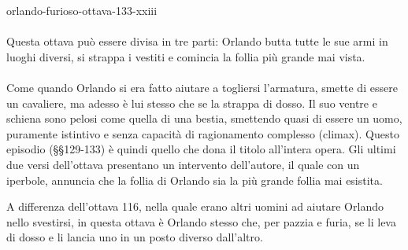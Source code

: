 \documentclass[preview]{standalone}
\begin{document}
\begin{snippet}{orlando-furioso-ottava-133-xxiii}
    \\\\
    Questa ottava può essere divisa in tre parti:
    Orlando butta tutte le sue armi in luoghi diversi, si strappa i vestiti
    e comincia la follia più grande mai vista.
    \\\\
    Come quando Orlando si era fatto aiutare a togliersi l'armatura, smette di essere un cavaliere,
    ma adesso è lui stesso che se la strappa di dosso.
    Il suo ventre e schiena sono pelosi come quella di una bestia,
    smettendo quasi di essere un uomo, puramente istintivo e senza capacità di ragionamento complesso (climax).
    Questo episodio (§§129-133) è quindi quello che dona il titolo all'intera opera.
    Gli ultimi due versi dell'ottava presentano un intervento dell'autore, il quale con un iperbole,
    annuncia che la follia di Orlando sia la più grande follia mai esistita.

    A differenza dell'ottava 116, nella quale erano altri uomini ad aiutare Orlando nello
    svestirsi, in questa ottava è Orlando stesso che, per pazzia e furia, se li leva di dosso
    e li lancia uno in un posto diverso dall'altro.
\end{snippet}
\end{document}
